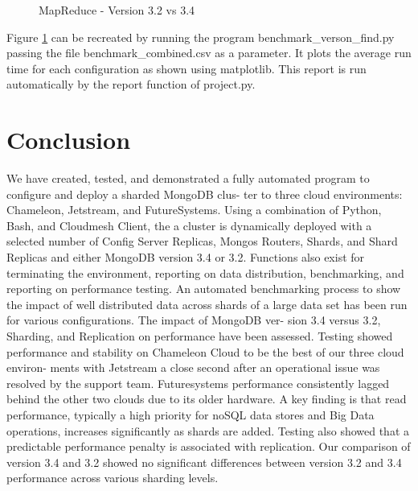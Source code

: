 \documentclass[sigconf]{acmart}
\begin{document}
\begin{figure}[htbp]
\centering
{}
\caption{MapReduce - Version 3.2 vs 3.4}
\label{fig:version-mapreduce}
\end{figure}

Figure \ref{fig:version-mapreduce} can be recreated by running the program benchmark\_verson\_find.py passing the file benchmark\_combined.csv as a parameter.  It plots the average run time for each configuration as shown using matplotlib.  This report is run automatically by the report function of project.py.




\section{Conclusion}

We have created, tested, and demonstrated a fully automated program to
configure and deploy a sharded MongoDB clus- ter to three cloud
environments: Chameleon, Jetstream, and FutureSystems. Using a
combination of Python, Bash, and Cloudmesh Client, the a cluster is
dynamically deployed with a selected number of Config Server Replicas,
Mongos Routers, Shards, and Shard Replicas and either MongoDB version
3.4 or 3.2. Functions also exist for terminating the environment,
reporting on data distribution, benchmarking, and reporting on
performance testing.  An automated benchmarking process to show the
impact of well distributed data across shards of a large data set has
been run for various configurations. The impact of MongoDB ver- sion
3.4 versus 3.2, Sharding, and Replication on performance have been
assessed. Testing showed performance and stability on Chameleon Cloud
to be the best of our three cloud environ- ments with Jetstream a
close second after an operational issue was resolved by the support
team. Futuresystems performance consistently lagged behind the other
two clouds due to its older hardware. A key finding is that read
performance, typically a high priority for noSQL data stores and Big
Data operations, increases significantly as shards are added. Testing
also showed that a predictable performance penalty is associated with
replication. Our comparison of version 3.4 and 3.2 showed no
significant differences between version 3.2 and 3.4 performance across
various sharding levels.




 
\end{document}
